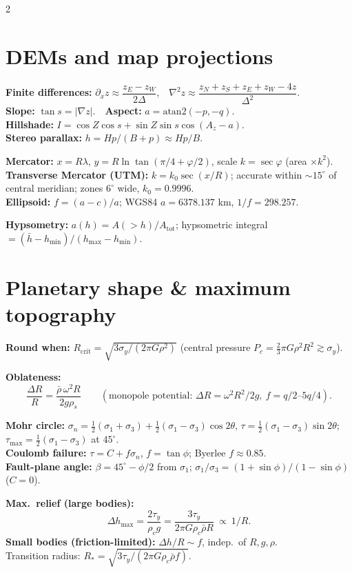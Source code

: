 \documentclass[9pt,a4paper]{extarticle}
\begin{document}
\begin{multicols}{2}
\section{DEMs and map projections}
\begin{eqbox}
\textbf{Finite differences:} $\partial_xz\approx\dfrac{z_E-z_W}{2\Delta}$,\ \ $\nabla^2z\approx\dfrac{z_N+z_S+z_E+z_W-4z}{\Delta^2}$.\\
\textbf{Slope:} $\tan s=|\nabla z|$.\ \ \textbf{Aspect:} $a=\mathrm{atan2}(-p,-q)$.\\
\textbf{Hillshade:} $I=\cos Z\cos s+\sin Z\sin s\cos(A_z-a)$.\\
\textbf{Stereo parallax:} $h=Hp/(B+p)\approx Hp/B$.
\end{eqbox}
\begin{eqbox}
\textbf{Mercator:} $x=R\lambda$, $y=R\ln\tan(\pi/4+\varphi/2)$, scale $k=\sec\varphi$ (area $\times k^2$).\\
\textbf{Transverse Mercator (UTM):} $k=k_0\sec(x/R)$; accurate within $\sim15^\circ$ of central meridian; zones $6^\circ$ wide, $k_0=0.9996$.\\
\textbf{Ellipsoid:} $f=(a-c)/a$; WGS84 $a=6378.137$ km, $1/f=298.257$.
\end{eqbox}
\begin{eqbox}
\textbf{Hypsometry:} $a(h)=A(>h)/A_\mathrm{tot}$; hypsometric integral $=(\bar h-h_{\min})/(h_{\max}-h_{\min})$.
\end{eqbox}

\section{Planetary shape \& maximum topography}
\begin{eqbox}
\textbf{Round when:} $R_\mathrm{crit}=\sqrt{3\sigma_y/(2\pi G\rho^2)}$ (central pressure $P_c=\tfrac23\pi G\rho^2R^2\gtrsim\sigma_y$).
\end{eqbox}
\begin{eqbox}
\textbf{Oblateness:}
\[
\boxed{\dfrac{\Delta R}{R}=\dfrac{\bar\rho\,\omega^2R}{2g\rho_s}}\qquad(\text{monopole potential: }\Delta R=\omega^2R^2/2g,\ f=q/2\text{--}5q/4).
\]
\end{eqbox}
\begin{eqbox}
\textbf{Mohr circle:} $\sigma_n=\tfrac12(\sigma_1+\sigma_3)+\tfrac12(\sigma_1-\sigma_3)\cos2\theta$, $\tau=\tfrac12(\sigma_1-\sigma_3)\sin2\theta$; $\tau_\mathrm{max}=\tfrac12(\sigma_1-\sigma_3)$ at $45^\circ$.\\
\textbf{Coulomb failure:} $\tau=C+f\sigma_n$, $f=\tan\phi$; Byerlee $f\approx0.85$.\\
\textbf{Fault-plane angle:} $\beta=45^\circ-\phi/2$ from $\sigma_1$; $\sigma_1/\sigma_3=(1+\sin\phi)/(1-\sin\phi)$ ($C=0$).
\end{eqbox}
\begin{eqbox}
\textbf{Max.\ relief (large bodies):}
\[
\Delta h_\mathrm{max}=\dfrac{2\tau_y}{\rho_cg}=\dfrac{3\tau_y}{2\pi G\rho_c\bar\rho R}\ \propto\ 1/R.
\]
\textbf{Small bodies (friction-limited):} $\Delta h/R\sim f$, indep.\ of $R,g,\rho$.\\
Transition radius: $R_*=\sqrt{3\tau_y/(2\pi G\rho_c\bar\rho f)}$.
\end{eqbox}


\end{multicols}
\end{document}
